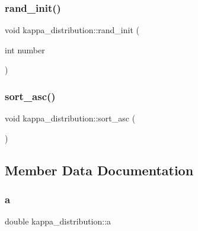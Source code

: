 \hypertarget{classkappa__distribution_a5e943b080c0c8a88e37a85100666cadb}{}\label{classkappa__distribution_a5e943b080c0c8a88e37a85100666cadb} 
\subsubsection{\texorpdfstring{rand\+\_\+init()}{rand\_init()}}
{\footnotesize\ttfamily void kappa\+\_\+distribution\+::rand\+\_\+init (\begin{DoxyParamCaption}\item[{int}]{number }\end{DoxyParamCaption})\hspace{0.3cm}{\ttfamily [inline]}}

\hypertarget{classkappa__distribution_ab18b8d4b45ba749340829da1ca18130c}{}\label{classkappa__distribution_ab18b8d4b45ba749340829da1ca18130c} 
\subsubsection{\texorpdfstring{sort\+\_\+asc()}{sort\_asc()}}
{\footnotesize\ttfamily void kappa\+\_\+distribution\+::sort\+\_\+asc (\begin{DoxyParamCaption}{ }\end{DoxyParamCaption})\hspace{0.3cm}{\ttfamily [inline]}}



\subsection{Member Data Documentation}
\hypertarget{classkappa__distribution_ac85c34598a6c6541660c024f509977c2}{}\label{classkappa__distribution_ac85c34598a6c6541660c024f509977c2} 
\subsubsection{\texorpdfstring{a}{a}}
{\footnotesize\ttfamily double kappa\+\_\+distribution\+::a}

\hypertarget{classkappa__distribution_ac9487f58886c93bede8d10f0660df323}{}\label{classkappa__distribution_ac9487f58886c93bede8d10f0660df323} 
